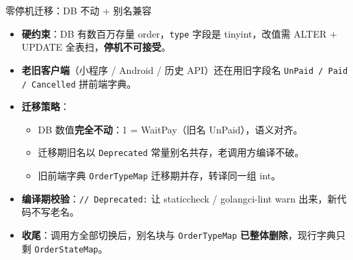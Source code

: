 \documentclass[aspectratio=169,11pt]{beamer}
\begin{document}
\begin{frame}[shrink]{零停机迁移：DB 不动 + 别名兼容}
\begin{itemize}
  \item \textbf{硬约束}：DB 有数百万存量 order，\texttt{type} 字段是 tinyint，改值需 ALTER + UPDATE 全表扫，\textbf{停机不可接受}。
  \item \textbf{老旧客户端}（小程序 / Android / 历史 API）还在用旧字段名 \texttt{UnPaid / Paid / Cancelled} 拼前端字典。
  \item \textbf{迁移策略}：
  \begin{itemize}
    \item DB 数值\textbf{完全不动}：1 = WaitPay（旧名 UnPaid），语义对齐。
    \item 迁移期旧名以 \texttt{Deprecated} 常量别名共存，老调用方编译不破。
    \item 旧前端字典 \texttt{OrderTypeMap} 迁移期并存，转译同一组 int。
  \end{itemize}
  \item \textbf{编译期校验}：\texttt{// Deprecated:} 让 staticcheck / golangci-lint warn 出来，新代码不写老名。
  \item \textbf{收尾}：调用方全部切换后，别名块与 \texttt{OrderTypeMap} \textbf{已整体删除}，现行字典只剩 \texttt{OrderStateMap}。
\end{itemize}
\end{frame}

\appendix
\end{document}

